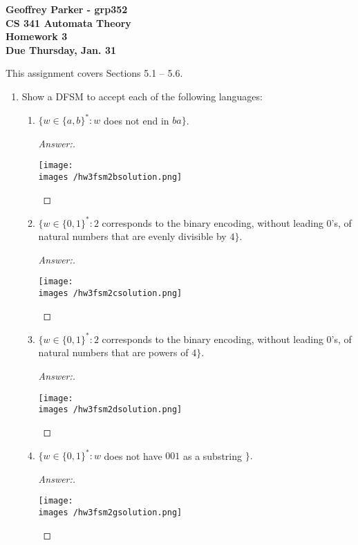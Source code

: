 \documentclass[10pt]{article}
\newcommand{\images}{/home/gparker/classes/341/images}
\begin{document}
\begin{flushleft}
\textbf{Geoffrey Parker - grp352 \\
CS 341 Automata Theory \\
Homework 3 \\
Due Thursday, Jan. 31}
\end{flushleft}
This assignment covers Sections 5.1 -- 5.6. \\

\begin{enumerate}
\addtocounter{enumi}{1}

\item
Show a DFSM to accept each of the following languages:
\begin{enumerate}

\addtocounter{enumii}{1}
\item
$\{w \in \{a, b\}^* : w$ does not end in $ba\}$.
\begin{proof}[Answer:] $ $\\
\begin{flushleft}
\texttt{[image: \\images /hw3fsm2bsolution.png]}
\end{flushleft}
\end{proof}


\item
$\{w \in \{0, 1\}^* : 2$ corresponds to the binary encoding, without leading $0$'s, of natural numbers that are evenly divisible by $4\}$.
\begin{proof}[Answer:] $ $\\
\begin{flushleft}
\texttt{[image: \\images /hw3fsm2csolution.png]}
\end{flushleft}
\end{proof}

\pagebreak
\item
$\{w \in \{0, 1\}^* : 2$ corresponds to the binary encoding, without leading $0$'s, of natural numbers that are powers of $4\}$.
\begin{proof}[Answer:] $ $\\
\begin{flushleft}
\texttt{[image: \\images /hw3fsm2dsolution.png]}
\end{flushleft}
\end{proof}

\addtocounter{enumii}{2}
\item
$\{w \in \{0, 1\}^* : w$ does not have $001$ as a substring $\}.$
\begin{proof}[Answer:] $ $\\
\begin{flushleft}
\texttt{[image: \\images /hw3fsm2gsolution.png]}
\end{flushleft}
\end{proof}


\end{enumerate}
\end{enumerate}
\end{document}
